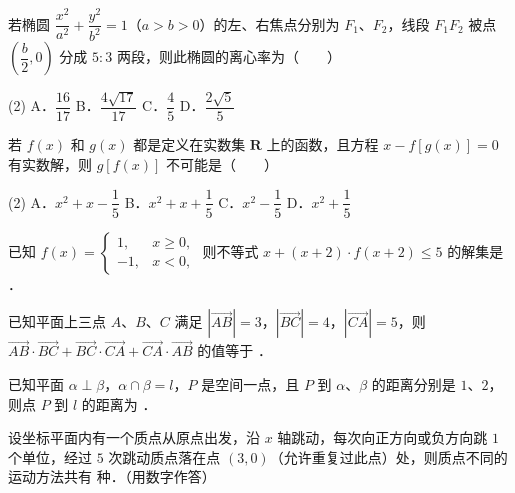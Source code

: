 \begin{question}
若椭圆 $\dfrac{x^2}{a^2} + \dfrac{y^2}{b^2} = 1$（$a > b > 0$）的左、右焦点分别为 $F_1$、$F_2$，线段 $F_1F_2$ 被点 $\left(\dfrac{b}{2}, 0\right)$ 分成 $5 : 3$ 两段，则此椭圆的离心率为\mbox{（　　）}

\begin{gkopts}(2)
\task A．$\dfrac{16}{17}$
\task B．$\dfrac{4\sqrt{17}}{17}$
\task C．$\dfrac{4}{5}$
\task D．$\dfrac{2\sqrt{5}}{5}$
\end{gkopts}

\end{question}
\begin{question}
若 $f(x)$ 和 $g(x)$ 都是定义在实数集 $\mathbf{R}$ 上的函数，且方程 $x - f[g(x)] = 0$ 有实数解，则 $g[f(x)]$ 不可能是\mbox{（　　）}

\begin{gkopts}(2)
\task A．$x^2 + x - \dfrac{1}{5}$
\task B．$x^2 + x + \dfrac{1}{5}$
\task C．$x^2 - \dfrac{1}{5}$
\task D．$x^2 + \dfrac{1}{5}$
\end{gkopts}

\end{question}

\begin{question}
已知 $f(x) = \begin{cases} 1, & x \geqslant 0, \\ -1, & x < 0, \end{cases}$ 则不等式 $x + (x + 2) \cdot f(x + 2) \leqslant 5$ 的解集是 \underline{\hspace{3cm}}．

\end{question}
\begin{question}
已知平面上三点 $A$、$B$、$C$ 满足 $|\vec{AB}| = 3$，$|\vec{BC}| = 4$，$|\vec{CA}| = 5$，则 $\vec{AB} \cdot \vec{BC} + \vec{BC} \cdot \vec{CA} + \vec{CA} \cdot \vec{AB}$ 的值等于 \underline{\hspace{3cm}}．

\end{question}
\begin{question}
已知平面 $\alpha \perp \beta$，$\alpha \cap \beta = l$，$P$ 是空间一点，且 $P$ 到 $\alpha$、$\beta$ 的距离分别是 $1$、$2$，则点 $P$ 到 $l$ 的距离为 \underline{\hspace{3cm}}．

\end{question}
\begin{question}
设坐标平面内有一个质点从原点出发，沿 $x$ 轴跳动，每次向正方向或负方向跳 $1$ 个单位，经过 $5$ 次跳动质点落在点 $(3, 0)$（允许重复过此点）处，则质点不同的运动方法共有 \underline{\hspace{3cm}} 种．（用数字作答）

\end{question}

